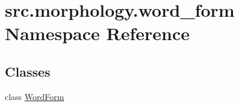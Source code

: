 \hypertarget{namespacesrc_1_1morphology_1_1word__form}{\section{src.\+morphology.\+word\+\_\+form Namespace Reference}
\label{namespacesrc_1_1morphology_1_1word__form}
}
\subsection*{Classes}
\begin{DoxyCompactItemize}
\item 
class \hyperlink{classsrc_1_1morphology_1_1word__form_1_1_word_form}{Word\+Form}
\end{DoxyCompactItemize}
